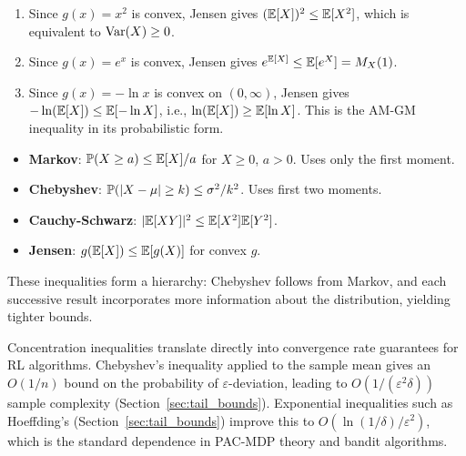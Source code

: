 \documentclass[11pt,a4paper]{article}
\begin{document}
\begin{example}
\label{ex:jensen_examples}
\begin{enumerate}[nosep,label=(\alph*)]
    \item Since $g(x) = x^2$ is convex, Jensen gives
    $(\mathbb{E}[X])^2 \leq \mathbb{E}[X^2]$, which is equivalent to $\operatorname{Var}(X) \geq 0$.
    \item Since $g(x) = e^x$ is convex, Jensen gives
    $e^{\mathbb{E}[X]} \leq \mathbb{E}[e^X] = M_X(1)$.
    \item Since $g(x) = -\ln x$ is convex on $(0, \infty)$,
    Jensen gives $-\ln(\mathbb{E}[X]) \leq \mathbb{E}[-\ln X]$, i.e.,
    $\ln(\mathbb{E}[X]) \geq \mathbb{E}[\ln X]$. This is the AM-GM inequality
    in its probabilistic form.
\end{enumerate}
\end{example}

\begin{keyresult}[title={Probability Inequalities Summary}]
\begin{itemize}[nosep]
    \item \textbf{Markov}: $\mathbb{P}(X \geq a) \leq \mathbb{E}[X]/a$ for
    $X \geq 0$, $a > 0$. Uses only the first moment.
    \item \textbf{Chebyshev}: $\mathbb{P}(|X - \mu| \geq k) \leq
    \sigma^2/k^2$. Uses first two moments.
    \item \textbf{Cauchy-Schwarz}: $|\mathbb{E}[XY]|^2 \leq \mathbb{E}[X^2]\mathbb{E}[Y^2]$.
    \item \textbf{Jensen}: $g(\mathbb{E}[X]) \leq \mathbb{E}[g(X)]$ for convex $g$.
\end{itemize}
These inequalities form a hierarchy: Chebyshev follows from Markov,
and each successive result incorporates more information about the
distribution, yielding tighter bounds.
\end{keyresult}

\begin{rlconnection}[title={Concentration Inequalities and
    Convergence Rates in RL}]
Concentration inequalities translate directly into convergence rate
guarantees for RL algorithms. Chebyshev's inequality applied to the
sample mean gives an $O(1/n)$ bound on the probability of
$\varepsilon$-deviation, leading to $O(1/(\varepsilon^2 \delta))$
sample complexity (Section~\ref{sec:tail_bounds}). Exponential
inequalities such as Hoeffding's (Section~\ref{sec:tail_bounds})
improve this to $O(\ln(1/\delta)/\varepsilon^2)$, which is the
standard dependence in PAC-MDP theory and bandit algorithms.
\end{rlconnection}
\end{document}
